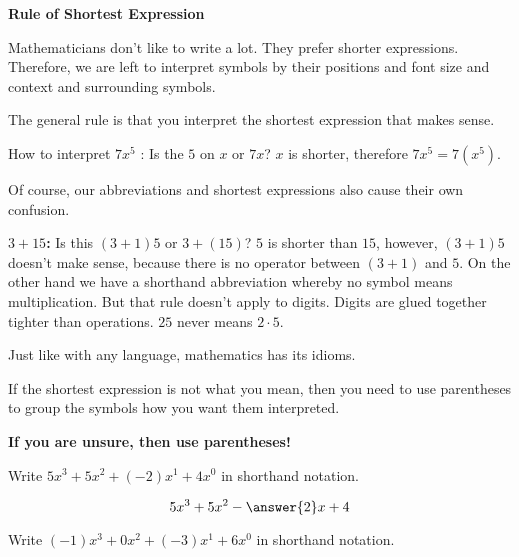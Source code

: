 \documentclass{ximera}
\begin{document}
\begin{warning} \textbf{\textcolor{red!90!darkgray}{Rule of Shortest Expression}} 

Mathematicians don't like to write a lot.  They prefer shorter expressions.  Therefore, we are left to interpret symbols by their positions and font size and context and surrounding symbols.

The general rule is that you interpret the shortest expression that makes sense.


How to interpret $7x^5$ : Is the $5$ on $x$ or $7x$?  $x$ is shorter, therefore $7x^5 = 7 (x^5)$.

Of course, our abbreviations and shortest expressions also cause their own confusion.

\textbf{$3+15$:} Is this $(3+1)5$ or $3+(15)$?  $5$ is shorter than $15$, however, $(3+1)5$ doesn't make sense, because there is no operator between $(3+1)$ and $5$.  On the other hand we have a shorthand abbreviation whereby no symbol means multiplication.  But that rule doesn't apply to digits.  Digits are glued together tighter than operations. $25$ never means $2 \cdot 5$.

Just like with any language, mathematics has its idioms.

If the shortest expression is not what you mean, then you need to use parentheses to group the symbols how you want them interpreted.

\begin{center}
\textbf{\textcolor{red!90!darkgray}{If you are unsure, then use parentheses!}} 
\end{center}


\end{warning}



\begin{question}

Write $5 x^3 + 5 x^2 + (-2) x^1 + 4 x^0$ in shorthand notation.


\[
5 x^3 + 5 x^2 - \answer{2} x + 4  
\]

\end{question}





\begin{question}

Write $(-1) x^3 + 0 x^2 + (-3) x^1 + 6 x^0$ in shorthand notation.


\begin{multipleChoice}
\end{multipleChoice}

\end{question}
\end{document}
